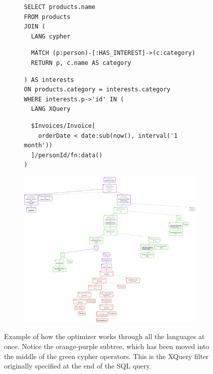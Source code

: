 \begin{figure}[htpb]
    \begin{subfigure}[b]{\textwidth}
    \begin{tcolorbox}[colback=white, colframe=black, boxrule=1pt, arc=0pt]
        \begin{verbatim}
SELECT products.name
FROM products
JOIN (
  LANG cypher
        \end{verbatim}
        \nestedMintedVspace
        \begin{verbatim}
  MATCH (p:person)-[:HAS_INTEREST]->(c:category)
  RETURN p, c.name AS category
        \end{verbatim}
        \nestedMintedVspace
        \begin{verbatim}
) AS interests
ON products.category = interests.category
WHERE interests.p->'id' IN (
  LANG XQuery
        \end{verbatim}
        \nestedMintedVspace
        \begin{verbatim}
  $Invoices/Invoice[
    orderDate < date:sub(now(), interval('1 month'))
  ]/personId/fn:data()
)

        \end{verbatim}
    \end{tcolorbox}
    \end{subfigure}

    \medskip
    
    \begin{subfigure}{\textwidth}
        \centering
        \includegraphics[width=\textwidth]{img/tree-multimodel-optimization.png}
    \end{subfigure}
    
    \caption{Example of how the optimizer works through all the languages at once. Notice the orange-purple subtree, which has been moved into the middle of the green cypher operators. This is the XQuery filter originally specified at the end of the SQL query.}
    \label{fig:tree-multimodel-optimization}
\end{figure}

